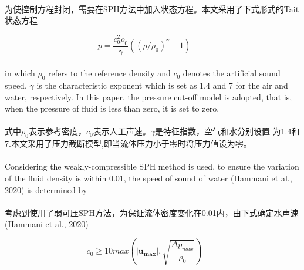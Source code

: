\documentclass[UTF8]{ctexart}
\begin{document}
\paragraph{\quad}为使控制方程封闭，需要在SPH方法中加入状态方程。本文采用了下式形式的Tait状态方程

\begin{equation}
   p=\frac{c_0^2 \rho_0}{\gamma}((\rho / \rho_0)^\gamma-1) \qquad 
\end{equation}

\paragraph{\quad}in which $\rho_0$ refers to the reference density and $c_0$ denotes the 
                artificial sound speed. $\gamma$ is the characteristic exponent which is 
                set as 1.4 and 7 for the air and water, respectively. In this paper, 
                the pressure cut-off model is adopted, that is, when the pressure of 
                fluid is less than zero, it is set to zero.
\paragraph{\quad}式中$\rho_0$表示参考密度，$c_0$表示人工声速。$\gamma$是特征指数，空气和水分别设置
                为1.4和7.本文采用了压力截断模型,即当流体压力小于零时将压力值设为零。

\paragraph{\quad}Considering the weakly-compressible SPH method is used, 
                to ensure the variation of the fluid density is within 0.01, 
                the speed of sound of water (Hammani et al., 2020) is determined by
\paragraph{\quad}考虑到使用了弱可压SPH方法，为保证流体密度变化在0.01内，由下式确定水声速(Hammani et al., 2020)

\begin{equation}
   c_0 \ge 10 max(|\mathbf{u_{max}}|,\sqrt{\frac{\Delta p_{max}}{\rho_0}}) \qquad 
\end{equation}
\end{document}
